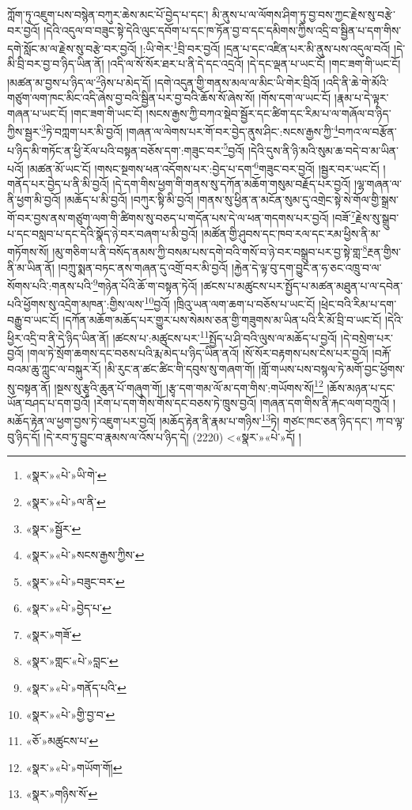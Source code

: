 ཀློག་ཏུ་འཇུག་པས་བསྙེན་བཀུར་ཆེས་མང་པོ་བྱེད་པ་དང་། མི་ནུས་པ་ལ་ལོགས་ཤིག་ཏུ་བྱ་བས་ཀྱང་རྗེས་སུ་བརྩེ་བར་བྱའོ། །དེའི་འདུལ་བ་བཟུང་སྟེ་དེའི་ལུང་དབོག་པ་དང་ཁ་ཏོན་བྱ་བ་དང་དམིགས་ཀྱིས་འདྲི་བ་སྦྱིན་པ་དག་གིས་དགེ་སློང་མ་ལ་རྗེས་སུ་བརྩེ་བར་བྱའོ། །:ཡི་གེར་\footnote{«སྣར་»«པེ་»ཡི་གེ་}བྲི་བར་བྱའོ། །དྲན་པ་དང་འཛིན་པར་མི་ནུས་པས་འདུལ་བའོ། །དེ་མི་བྲི་བར་བྱ་བ་ཉིད་ཡིན་ནོ། །འདི་ལ་སོ་སོར་ཐར་པ་ནི་དེ་དང་འདྲའོ། །དེ་དང་ལྡན་པ་ཡང་ངོ། །གང་ཟག་གི་ཡང་ངོ། །མཚན་མ་བྱས་པ་ཉིད་ལ་\footnote{«སྣར་»«པེ་»ལ་ནི་}ཉེས་པ་མེད་དོ། །དགེ་འདུན་གྱི་གནས་མལ་ལ་མིང་ཡི་གེར་བྲིའོ། །འདི་ནི་ཆེ་གེ་མོའི་གཙུག་ལག་ཁང་མིང་འདི་ཞེས་བྱ་བའི་སྦྱིན་པར་བྱ་བའི་ཆོས་སོ་ཞེས་སོ། །གོས་དག་ལ་ཡང་ངོ། །རྣམ་པ་དེ་ལྟར་གཞན་པ་ཡང་ངོ། །གང་ཟག་གི་ཡང་ངོ། །སངས་རྒྱས་ཀྱི་བཀའ་སྡེབ་སྦྱོར་དང་ཚིག་དང་རིམ་པ་ལ་གཞོལ་བ་ཉིད་ཀྱིས་སྦྱར་\footnote{«སྣར་»སྦྱོར་}ཏེ་བཀླག་པར་མི་བྱའོ། །གཞན་ལ་ལེགས་པར་གོ་བར་བྱེད་ནུས་ཤིང་:སངས་རྒྱས་ཀྱི་\footnote{«སྣར་»«པེ་»སངས་རྒྱས་ཀྱིས་}བཀའ་ལ་བརྩོན་པ་ཉིད་མི་གཏོང་ན་ཕྱི་རོལ་པའི་བསྟན་བཅོས་དག་:གཟུང་བར་\footnote{«སྣར་»«པེ་»བཟུང་བར་}བྱའོ། །དེའི་དུས་ནི་ཉི་མའི་སུམ་ཆ་བདེ་བ་མ་ཡིན་པའོ། །མཚན་མོ་ཡང་ངོ། །གསང་སྔགས་ཕན་འདོགས་པར་:བྱེད་པ་དག་\footnote{«སྣར་»«པེ་»བྱེད་པ་}གཟུང་བར་བྱའོ། །སྦྱར་བར་ཡང་ངོ། །གནོད་པར་བྱེད་པ་ནི་མི་བྱའོ། །དེ་དག་གིས་ཕྱག་གི་གནས་སུ་དཀོན་མཆོག་གསུམ་བརྗོད་པར་བྱའོ། །ལྷ་གཞན་ལ་ནི་ཕྱག་མི་བྱའོ། །མཆོད་པ་མི་བྱའོ། །བཀུར་སྟི་མི་བྱའོ། །གནས་སུ་ཕྱིན་ན་མངོན་སུམ་དུ་འགྲེང་སྟེ་སེ་གོལ་གྱི་སྒྲས་གོ་བར་བྱས་ནས་གཙུག་ལག་གི་ཚིགས་སུ་བཅད་པ་གདོན་པས་དེ་ལ་ཕན་གདགས་པར་བྱའོ། །བཟོ་\footnote{«སྣར་»གཟོ་}རྗེས་སུ་སྒྲུབ་པ་དང་བསླབ་པ་དང་དེའི་སྣོད་ཉེ་བར་བཞག་པ་མི་བྱའོ། །མཚོན་གྱི་ཤུབས་དང་ཁབ་རལ་དང་རམ་ཕྱིས་ནི་མ་གཏོགས་སོ། །མུ་གཅིག་པ་ནི་བསོད་ནམས་ཀྱི་བསམ་པས་དགེ་བའི་གསོ་བ་ཉེ་བར་བསྒྲུབ་པར་བྱ་སྟེ་གླ་\footnote{«སྣར་»གླང་«པེ་»བླང་}རྔན་གྱིས་ནི་མ་ཡིན་ནོ། །བཀྲུ་སྨན་བཏང་ནས་གཞན་དུ་འགྲོ་བར་མི་བྱའོ། །རྐྱེན་དེ་ལྟ་བུ་དག་བྱུང་ན་ཧ་ཅང་འཁྲུ་བ་ལ་སོགས་པའི་:གནས་པའི་\footnote{«སྣར་»«པེ་»གནོད་པའི་}གཉེན་པོའི་ཆོ་ག་བསྟན་ཏེའོ། །ཚངས་པ་མཚུངས་པར་སྤྱོད་པ་མཚན་མཐུན་པ་ལ་དབེན་པའི་ཕྱོགས་སུ་འདྲེག་མཁན་:གྱིས་ལས་\footnote{«སྣར་»«པེ་»གྱི་བྱ་བ་}བྱའོ། །ཁྲིའུ་ཡན་ལག་ཆག་པ་བཅོས་པ་ཡང་ངོ། །ཕྲེང་བའི་རིམ་པ་དག་བརྒྱུ་བ་ཡང་ངོ། །དཀོན་མཆོག་མཆོད་པར་གྱུར་པས་སེམས་ཅན་གྱི་གཟུགས་མ་ཡིན་པའི་རི་མོ་བྲི་བ་ཡང་ངོ། །དེའི་ཕྱིར་འདྲི་བ་ནི་དེ་ཉིད་ཡིན་ནོ། །ཚངས་པ་:མཚུངས་པར་\footnote{«ཅོ་»མཚུངས་པ་}སྤྱོད་པ་ཤི་བའི་ལུས་ལ་མཆོད་པ་བྱའོ། །དེ་བསྲེག་པར་བྱའོ། །གལ་ཏེ་སྲོག་ཆགས་དང་བཅས་པའི་རྨ་མེད་པ་ཉིད་ཡིན་ནའོ། །སོ་སོར་བརྟགས་པས་ངེས་པར་བྱའོ། །བརྐོ་བའམ་ཆུ་ཀླུང་ལ་བསྐུར་རོ། །མི་རུང་ན་ཚང་ཚིང་གི་དབུས་སུ་གཞག་གོ། །གློ་གཡས་པས་བསྙལ་ཏེ་མགོ་བྱང་ཕྱོགས་སུ་བསྟན་ནོ། །སྔས་སུ་རྩྭའི་ཆུན་པོ་གཞུག་གོ། །རྩྭ་དག་གམ་ལོ་མ་དག་གིས་:གཡོགས་སོ།\footnote{«སྣར་»«པེ་»གཡོག་གོ།} །ཆོས་མཉན་པ་དང་ཡོན་བཤད་པ་དག་བྱའོ། །རེག་པ་དག་གིས་གོས་དང་བཅས་ཏེ་ཁྲུས་བྱའོ། །གཞན་དག་གིས་ནི་རྐང་ལག་བཀྲུའོ། །མཆོད་རྟེན་ལ་ཕྱག་བྱས་ཏེ་འཇུག་པར་བྱའོ། །མཆོད་རྟེན་ནི་རྣམ་པ་གཉིས་\footnote{«སྣར་»གཉིས་སོ་}ཏེ། གཙང་ཁང་ཅན་ཉིད་དང་། ཀ་བ་ལྟ་བུ་ཉིད་དོ། །དེ་རབ་ཏུ་བྱུང་བ་རྣམས་ལ་འོས་པ་ཉིད་དེ། (2220) <«སྣར་»«པེ་»དོ། །
